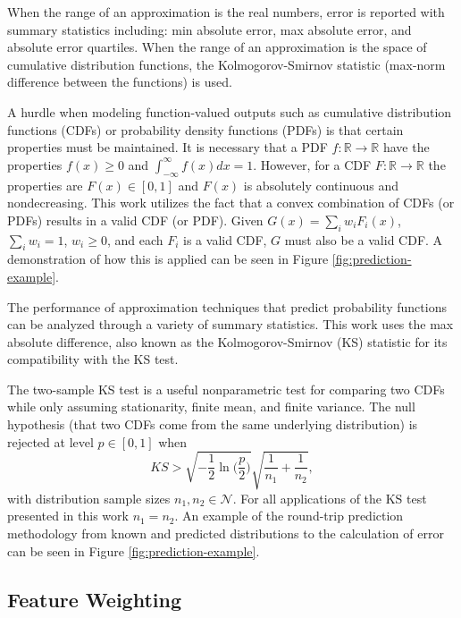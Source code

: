 When the range of an approximation is the real numbers, error is
reported with summary statistics including: min absolute error, max
absolute error, and absolute error quartiles. When the range of an
approximation is the space of cumulative distribution functions, the
Kolmogorov-Smirnov statistic (max-norm difference between the
functions) is used.

A hurdle when modeling function-valued outputs such as cumulative
distribution functions (CDFs) or probability density functions (PDFs)
is that certain properties must be maintained. It is necessary that a
PDF $f: \mathbb{R} \rightarrow \mathbb{R}$ have the properties $f(x)
\geq 0$ and $\int_{-\infty}^{\infty}f(x)dx = 1$. However, for a CDF
$F: \mathbb{R} \rightarrow \mathbb{R}$ the properties are
$F(x) \in [0,1]$ and $F(x)$ is absolutely continuous and
nondecreasing. This work utilizes the fact that a convex combination
of CDFs (or PDFs) results in a valid CDF (or PDF). Given $G(x) =
\sum_{i}w_i F_i(x)$, $\sum_{i} w_i = 1$, $w_i \geq 0$, and each $F_i$
is a valid CDF, $G$ must also be a valid CDF. A demonstration of how
this is applied can be seen in Figure \ref{fig:prediction-example}.

The performance of approximation techniques that predict probability
functions can be analyzed through a variety of summary
statistics. This work uses the max absolute difference, also known as
the Kolmogorov-Smirnov (KS) statistic \cite{lilliefors1967kolmogorov}
for its compatibility with the KS test.

The two-sample KS test is a useful nonparametric test for comparing
two CDFs while only assuming stationarity, finite mean, and finite
variance. The null hypothesis (that two CDFs come from the same
underlying distribution) is rejected at level $p \in [0,1]$ when
 $$ KS > \sqrt{-\frac{1}{2}\ln\biggl(\frac{p}{2}\biggr)} \sqrt{\frac{1}{n_1} + \frac{1}{n_2}}, $$
with distribution sample sizes $n_1,n_2 \in \mathcal{N}$. For all
applications of the KS test presented in this work $n_1 = n_2$. An
example of the round-trip prediction methodology from known and
predicted distributions to the calculation of error can be seen in
Figure \ref{fig:prediction-example}.


\subsection{Feature Weighting}
\label{sec:feature_weighting}

